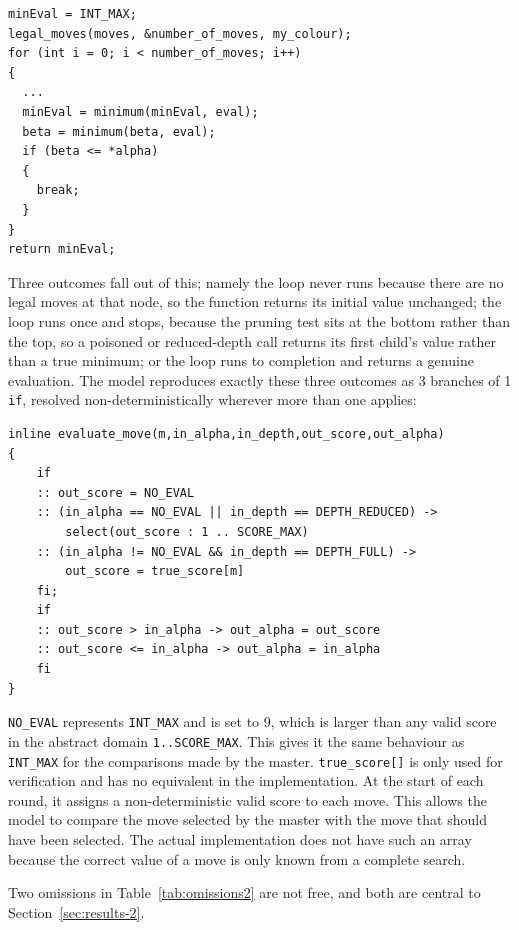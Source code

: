 \documentclass[10pt,a4paper]{article}
\newcommand{\code}[1]{\texttt{#1}}
\begin{document}
\begin{lstlisting}[style=clang,caption={The minimising branch of \code{minimax}}]
minEval = INT_MAX;
legal_moves(moves, &number_of_moves, my_colour);
for (int i = 0; i < number_of_moves; i++)
{
  ...
  minEval = minimum(minEval, eval);
  beta = minimum(beta, eval);
  if (beta <= *alpha)
  {
    break;
  }
}
return minEval;
\end{lstlisting}

Three outcomes fall out of this; namely the loop never runs because there are no
legal moves at that node, so the function returns its initial value
unchanged; the loop runs once and stops, because the pruning test sits at
the bottom rather than the top, so a poisoned or reduced-depth call returns
its first child's value rather than a true minimum; or the loop runs to
completion and returns a genuine evaluation. The model reproduces exactly
these three outcomes as 3 branches of 1 \code{if}, resolved
non-deterministically wherever more than one applies:

\begin{lstlisting}[style=promela,caption={\code{evaluate\_move}, the abstraction of \code{minimax\_pruning}}]
inline evaluate_move(m,in_alpha,in_depth,out_score,out_alpha)
{
	if
	:: out_score = NO_EVAL
	:: (in_alpha == NO_EVAL || in_depth == DEPTH_REDUCED) ->
		select(out_score : 1 .. SCORE_MAX)
	:: (in_alpha != NO_EVAL && in_depth == DEPTH_FULL) ->
		out_score = true_score[m]
	fi;
	if
	:: out_score > in_alpha -> out_alpha = out_score
	:: out_score <= in_alpha -> out_alpha = in_alpha
	fi
}
\end{lstlisting}

\code{NO\_EVAL} represents \code{INT\_MAX} and is set to 9, which is larger 
than any valid score in the abstract domain \code{1..SCORE\_MAX}. This gives it 
the same behaviour as \code{INT\_MAX} for the comparisons made by the master. 
\code{true\_score[]} is only used for verification and has no equivalent in 
the implementation. At the start of each round, it assigns a non-deterministic 
valid score to each move. This allows the model to compare the move selected 
by the master with the move that should have been selected. The actual 
implementation does not have such an array because the correct value of a 
move is only known from a complete search.

Two omissions in Table~\ref{tab:omissions2} are not free, and both are
central to Section~\ref{sec:results-2}.
\end{document}
